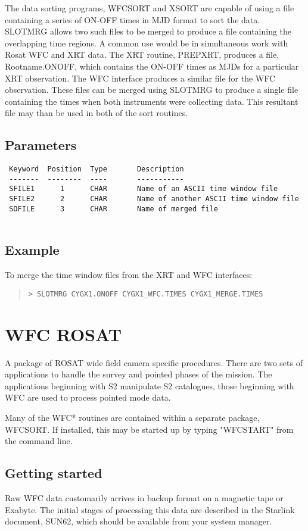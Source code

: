 \documentclass{book}
\renewcommand{\_}{{\tt\char'137}}     %
\begin{document}
The data sorting programs, WFCSORT and XSORT are capable of using a
file containing a series of ON-OFF times in MJD format to sort the data.
SLOTMRG allows two such files to be merged to produce a file containing
the overlapping time regions. A common use would be in simultaneous
work with Rosat WFC and XRT data. The XRT routine, PREPXRT, produces a
file, Rootname.ONOFF, which contains the ON-OFF times as MJDs for a
particular XRT observation. The WFC interface produces a similar file
for the WFC observation. These files can be merged using SLOTMRG to
produce a single file containing the times when both instruments were
collecting data. This resultant file may than be used in both of the
sort routines.
 
\subsection{Parameters}
\begin{verbatim}
 Keyword  Position  Type       Description
 -------  --------  ----       -----------
 SFILE1      1      CHAR       Name of an ASCII time window file
 SFILE2      2      CHAR       Name of another ASCII time window file
 SOFILE      3      CHAR       Name of merged file
 
\end{verbatim}\subsection{Example}
To merge the time window files from the XRT and WFC interfaces:
\begin{quote}\begin{verbatim}
> SLOTMRG CYGX1.ONOFF CYGX1_WFC.TIMES CYGX1_MERGE.TIMES
\end{verbatim}\end{quote}
\section{WFC ROSAT}
A package of ROSAT wide field camera specific procedures. There are two
sets of applications to handle the survey and pointed phases of the
mission. The applications beginning with S2 manipulate S2 catalogues,
those beginning with WFC are used to process pointed mode data.
 
Many of the WFC* routines are contained within a separate package, WFCSORT.
If installed, this may be started up by typing "WFCSTART" from the
command line.
 
\subsection{Getting started}
Raw WFC data customarily arrives in backup format on a
magnetic tape or Exabyte. The initial stages of processing this data are
described in the Starlink document, SUN62, which should be available from
your system manager.
 
\end{document}
